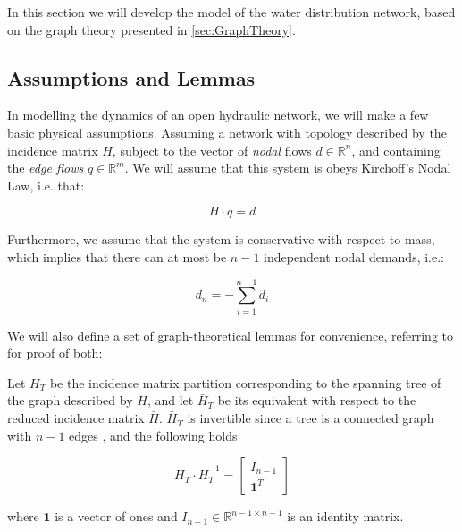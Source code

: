 In this section we will develop the model of the water distribution network, based on the graph theory presented in \cref{sec:GraphTheory}.

\subsection{Assumptions and Lemmas}\label{subsec:AsssumAndLemmas}

In modelling the dynamics of an open hydraulic network, we will make a few basic physical assumptions. Assuming a network with topology described by the incidence matrix $H$, subject to the vector of \textit{nodal} flows $d \in \mathbb{R}^n$, and containing the \textit{edge flows} $q \in \mathbb{R}^m$. We will assume that this system is obeys Kirchoff's Nodal Law, i.e. that:

\begin{equation}\label{eq:KirchNodeLaw}
	H\cdot q = d
\end{equation} 

Furthermore, we assume that the system is conservative with respect to mass, which implies that there can at most be $n-1$ independent nodal demands, i.e.:

\begin{equation}\label{eq:MassConservation}
	d_n = -\sum_{i=1}^{n-1}d_i
\end{equation}

We will also define a set of graph-theoretical lemmas for convenience, referring to \cite{Jensen} for proof of both:

\begin{lemma}\label{lem:TreePartitionLemma}
	Let $H_T$ be the incidence matrix partition corresponding to the spanning tree of the graph described by $H$, and let $\bar{H}_T$ be its equivalent with respect to the reduced incidence matrix $\bar{H}$. $\bar{H}_T$ is invertible since a tree is a connected graph with $n-1$ edges \cite{Deo}, and the following holds
	
	\begin{equation}\label{eq:TreePartitionLemma}
		H_T\cdot\bar{H}_T^{-1} = \begin{bmatrix} I_{n-1} \\ \mathbf{1}^T	\end{bmatrix}
	\end{equation}

where $\mathbf{1}$ is a vector of ones and $I_{n-1} \in \mathbb{R}^{n-1 \times n-1}$ is an identity matrix.
\end{lemma}

